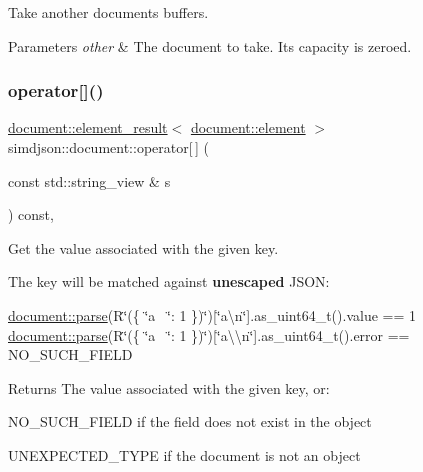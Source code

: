 Take another document\textquotesingle{}s buffers. 


\begin{DoxyParams}{Parameters}
{\em other} & The document to take. Its capacity is zeroed. \\
\hline
\end{DoxyParams}
\mbox{\label{classsimdjson_1_1document_ad986ccb287bf2c75697dbc90b3246090}} 
\subsubsection{\texorpdfstring{operator[]()}{operator[]()}\hspace{0.1cm}{\footnotesize\ttfamily [1/2]}}
{\footnotesize\ttfamily \hyperlink{classsimdjson_1_1document_1_1element__result}{document\+::element\+\_\+result}$<$ \hyperlink{classsimdjson_1_1document_1_1element}{document\+::element} $>$ simdjson\+::document\+::operator\mbox{[}$\,$\mbox{]} (\begin{DoxyParamCaption}\item[{const std\+::string\+\_\+view \&}]{s }\end{DoxyParamCaption}) const\hspace{0.3cm}{\ttfamily [inline]}, {\ttfamily [noexcept]}}



Get the value associated with the given key. 

The key will be matched against {\bfseries unescaped} J\+S\+ON\+:

\hyperlink{classsimdjson_1_1document_a6f11cda7c4a06fffdc00fdc97d98ae2b}{document\+::parse}(R\char`\"{}(\{ \char`\"{}a~\newline
\char`\"{}\+: 1 \})\char`\"{})\mbox{[}\char`\"{}a\textbackslash{}n\char`\"{}\mbox{]}.as\+\_\+uint64\+\_\+t().value == 1 \hyperlink{classsimdjson_1_1document_a6f11cda7c4a06fffdc00fdc97d98ae2b}{document\+::parse}(R\char`\"{}(\{ \char`\"{}a~\newline
\char`\"{}\+: 1 \})\char`\"{})\mbox{[}\char`\"{}a\textbackslash{}\textbackslash{}n\char`\"{}\mbox{]}.as\+\_\+uint64\+\_\+t().error == N\+O\+\_\+\+S\+U\+C\+H\+\_\+\+F\+I\+E\+LD

\begin{DoxyReturn}{Returns}
The value associated with the given key, or\+:
\begin{DoxyItemize}
\item N\+O\+\_\+\+S\+U\+C\+H\+\_\+\+F\+I\+E\+LD if the field does not exist in the object
\item U\+N\+E\+X\+P\+E\+C\+T\+E\+D\+\_\+\+T\+Y\+PE if the document is not an object 
\end{DoxyItemize}
\end{DoxyReturn}


